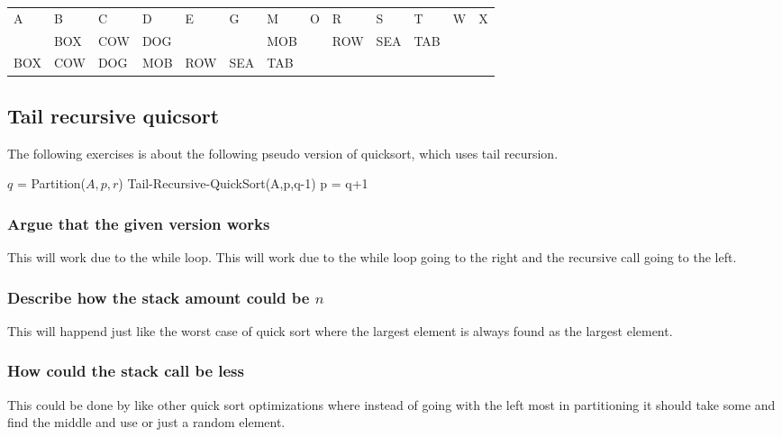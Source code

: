\documentclass[12pt, a4paper]{article}
\begin{document}
\begin{table}[h!]
\begin{tabular}{|l|l|l|l|l|l|l|l|l|l|l|l|l|}
					A   & B                                                 & C   & D   & E   & G   & M   & O                                                                   & R   & S   & T   & W                                                 & X   \\
					    & BOX                                               & COW & DOG &     &     & MOB &                                                                     & ROW & SEA & TAB &                                                   &     \\ \hline
					BOX & COW                                               & DOG & MOB & ROW & SEA & TAB &                                                                     &     &     &     &                                                   &     \\ \hline
					\end{tabular}
					\end{table}	
			\subsection{Tail recursive quicsort}
				The following exercises is about the following pseudo version of quicksort, which uses tail recursion.\\
				\begin{algorithmic}[1]
						\State $q$ = Partition($A,p,r$)
						\State Tail-Recursive-QuickSort(A,p,q-1)
						\State p = q+1
					\EndWhile
				\end{algorithmic}
				\subsubsection{Argue that the given version works}
					This will work due to the while loop. This will work due to the while loop going to the right and the recursive call going to the left.
				\subsubsection{Describe how the stack amount could be $n$}
					This will happend just like the worst case of quick sort where the largest element is always found as the largest element.
				\subsubsection{How could the stack call be less}
					This could be done by like other quick sort optimizations where instead of going with the left most in partitioning it should take some and find the middle and use or just a random element.
\end{document}
